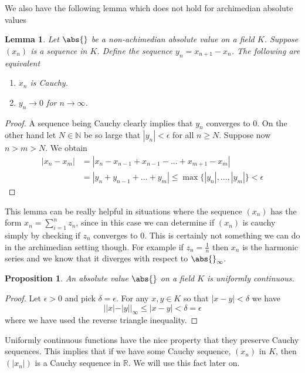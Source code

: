 \documentclass{article}
\newtheorem{proposition}{Proposition}[section]
\newtheorem{lemma}{Lemma}[section]
\newcommand{\mbb}[1]{\mathbb{#1}}
\numberwithin{equation}{section}
\begin{document}
We also have the following lemma which does not hold for archimedian absolute values

\begin{lemma} \label{lem:SufficientConditionForConvergence}
    Let $\abs{}$ be a non-achimedian absolute value on a field $K$. Suppose $(x_n)$ is a sequence in $K$. Define the sequence $y_n = x_{n+1} - x_{n}$. The following are equivalent
    \begin{enumerate}
        \item $x_n$ is Cauchy.
        \item $y_n \to 0$ for $n \to \infty$.
    \end{enumerate}
\end{lemma}
\begin{proof}
    A sequence being Cauchy clearly implies that $y_n$ converges to 0. On the other hand let $N \in \mbb N$ be so large that $|y_n| < \epsilon$ for all $n \geq N$. Suppose now $n > m > N$. We obtain
    \begin{align*}
        |x_n - x_m| & = |x_n - x_{n-1} + x_{n-1} - ... + x_{m+1} - x_{m}|                          \\
                    & = |y_n + y_{n-1} + ... + y_{m}| \leq \max \{|y_n|, ..., |y_m|  \} < \epsilon
    \end{align*}
\end{proof}
This lemma can be really helpful in situations where the sequence $(x_n)$ has the form $x_n = \sum_{i = 1}^n z_n$, since in this case we can determine if $(x_n)$ is cauchy simply by checking if $z_n$ converges to 0. This is certainly not something we can do in the archimedian setting though. For example if $z_n = \frac{1}{n}$ then $x_n$ is the harmonic series and we know that it diverges with respect to $\abs{}_\infty$.

\begin{proposition}
    An absolute value $\abs{}$ on a field $K$ is uniformly continuous.
\end{proposition}
\begin{proof}
    Let $\epsilon > 0$ and pick $\delta = \epsilon$. For any $x,y \in K$ so that $|x - y| < \delta$ we have
    $$||x| - |y||_\infty \leq |x - y| < \delta = \epsilon$$
    where we have used the reverse triangle inequality.
\end{proof}

Uniformly continuous functions have the nice property that they preserve Cauchy sequences. This implies that if we have some Cauchy sequence, $(x_n)$ in $K$, then $(|x_n|)$ is a Cauchy sequence in $\mbb R$. We will use this fact later on.
\end{document}
